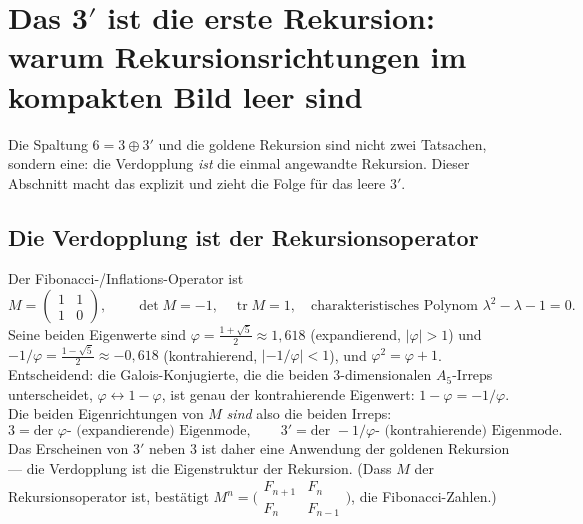 \section{Das 3$'$ ist die erste Rekursion: warum Rekursionsrichtungen im kompakten Bild leer sind}
Die Spaltung $6=3\oplus3'$ und die goldene Rekursion sind nicht zwei Tatsachen, sondern eine:
die Verdopplung \emph{ist} die einmal angewandte Rekursion. Dieser Abschnitt macht das explizit
und zieht die Folge f\"ur das leere $3'$.

\subsection{Die Verdopplung ist der Rekursionsoperator}
Der Fibonacci-/Inflations-Operator ist
\begin{equation}
M=\begin{pmatrix}1&1\\1&0\end{pmatrix},\qquad \det M=-1,\quad \operatorname{tr}M=1,\quad
\text{charakteristisches Polynom }\lambda^2-\lambda-1=0 .
\end{equation}
Seine beiden Eigenwerte sind $\varphi=\tfrac{1+\sqrt5}{2}\approx1{,}618$ (expandierend,
$|\varphi|>1$) und $-1/\varphi=\tfrac{1-\sqrt5}{2}\approx-0{,}618$ (kontrahierend,
$|{-}1/\varphi|<1$), und $\varphi^2=\varphi+1$. Entscheidend: die Galois-Konjugierte, die die
beiden $3$-dimensionalen $A_5$-Irreps unterscheidet, $\varphi\leftrightarrow1-\varphi$, ist
genau der kontrahierende Eigenwert: $1-\varphi=-1/\varphi$. Die beiden Eigenrichtungen von $M$
\emph{sind} also die beiden Irreps:
\[
3 = \text{der }\varphi\text{- (expandierende) Eigenmode},\qquad
3' = \text{der }-1/\varphi\text{- (kontrahierende) Eigenmode}.
\]
Das Erscheinen von $3'$ neben $3$ ist daher eine Anwendung der goldenen Rekursion --- die
Verdopplung ist die Eigenstruktur der Rekursion. (Dass $M$ der Rekursionsoperator ist, best\"atigt
$M^n=\bigl(\begin{smallmatrix}F_{n+1}&F_n\\F_n&F_{n-1}\end{smallmatrix}\bigr)$, die
Fibonacci-Zahlen.)

